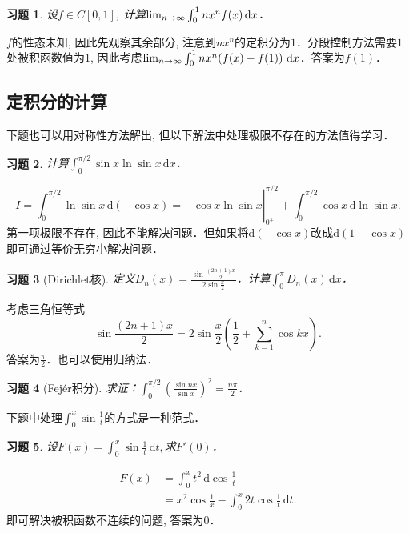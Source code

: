 \documentclass[11pt,a4paper]{ctexart}
\makeatletter
\theoremstyle{thmseries} %
\theoremstyle{exerseries}
\newtheorem{exer}{习题}[section]
\renewenvironment{proof}[1][\proofname]{\par
  \pushQED{\qed}%
  \normalfont \topsep6\p@\@plus6\p@\relax
  \trivlist
  \item[\hskip\labelsep
        \itshape
    #1\@addpunct{}]\ignorespaces
}{%
  \popQED\endtrivlist\@endpefalse
}
\newenvironment{sol}{\begin{proof}[\bfseries\upshape 解\quad]}{\end{proof}}
\newcommand{\bra}[1]{\mathopen{}\left(#1\right)}
\renewcommand{\d}{\mathrm{d}}
\def \nti {\mathnormal{n}\to\infty}
\makeatother
\begin{document}
\begin{exer}
	设$f\in C[0,1]$, 计算$\lim_{\nti}\int_{0}^{1}nx^nf(x)\,\d x$．
\end{exer}
\begin{sol}
	$f$的性态未知, 因此先观察其余部分, 注意到$nx^n$的定积分为$1$．分段控制方法需要$1$处被积函数值为$1$, 因此考虑$\lim_{\nti}\int_{0}^{1}nx^n\bra{f(x)-f(1)}\,\d x$．答案为$f(1)$．
\end{sol}


\subsection{定积分的计算}
下题也可以用对称性方法解出, 但以下解法中处理极限不存在的方法值得学习．
\begin{exer}
	计算$\int_{0}^{\pi/2}\sin x\ln\sin x\,\d x$．
\end{exer}
\begin{sol}
	\[\left.I=\int_{0}^{\pi/2}\ln\sin x\,\d(-\cos x)=-\cos x\ln\sin x\right|_{0^+}^{\pi/2}+\int_{0}^{\pi/2}\cos x\,\d\ln\sin x.\]
	第一项极限不存在, 因此不能解决问题．但如果将$\d(-\cos x)$改成$\d(1-\cos x)$即可通过等价无穷小解决问题．
\end{sol}

\begin{exer}[Dirichlet核]
	定义$D_n(x)=\frac{\sin\frac{(2n+1)x}{2}}{2\sin\frac{x}{2}}$．计算$\int_{0}^{\pi}D_n(x)\,\d x$．
\end{exer}
\begin{sol}
	考虑三角恒等式
	\[\sin\frac{(2n+1)x}{2}=2\sin\frac{x}{2}\bra{\frac{1}{2}+\sum_{k=1}^{n}\cos kx}.\]
	答案为$\frac{\pi}{2}$．也可以使用归纳法．
\end{sol}

\begin{exer}[Fejér积分]
	求证：$\int_{0}^{\pi/2}\bra{\frac{\sin nx}{\sin x}}^2=\frac{n\pi}{2}$．
\end{exer}

下题中处理$\int_{0}^{x}\sin\frac{1}{t}$的方式是一种范式．
\begin{exer}
	设$F(x)=\int_{0}^{x}\sin\frac{1}{t}\,\d t,$求$F'(0)$．
\end{exer}
\begin{sol}
	\begin{align*}
		F(x)&=\int_{0}^{x}t^2\,\d\cos\frac{1}{t}\\
		&=x^2\cos\frac{1}{x}-\int_{0}^{x}2t\cos\frac{1}{t}\,\d t.
	\end{align*}
	即可解决被积函数不连续的问题, 答案为$0$．
\end{sol}
\end{document}
